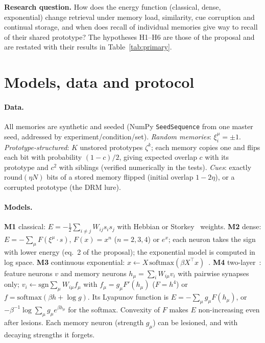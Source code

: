 \documentclass[10pt,a4paper]{article}
\begin{document}
\textbf{Research question.} How does the energy function (classical, dense, exponential) change retrieval under
memory load, similarity, cue corruption and continual storage, and when does recall of individual memories give way to
recall of their shared prototype? The hypotheses H1--H6 are those of the proposal and are restated with
their results in Table~\ref{tab:primary}.

\section{Models, data and protocol}
\paragraph{Data.} All memories are synthetic and seeded (NumPy \texttt{SeedSequence} from one master seed,
addressed by experiment/condition/set). \emph{Random memories}: $\xi_i^\mu=\pm1$. \emph{Prototype-structured}:
$K$ unstored prototypes $\zeta^k$; each memory copies one and flips each bit with probability $(1-c)/2$,
giving expected overlap $c$ with its prototype and $c^2$ with siblings (verified numerically in the tests).
\emph{Cues}: exactly $\mathrm{round}(\eta N)$ bits of a stored memory flipped (initial overlap $1-2\eta$), or a
corrupted prototype (the DRM lure).

\paragraph{Models.}
\textbf{M1} classical: $E=-\tfrac12\sum_{i\ne j}W_{ij}s_is_j$ with Hebbian or Storkey~\cite{storkey97} weights.
\textbf{M2} dense: $E=-\sum_\mu F(\xi^\mu\!\cdot s)$, $F(x)=x^n$ ($n=2,3,4$) or $e^x$; each neuron takes the sign
with lower energy (eq.~2 of the proposal); the exponential model is computed in log space.
\textbf{M3} continuous exponential: $x\leftarrow X\,\mathrm{softmax}(\beta X^\top x)$~\cite{ramsauer21}.
\textbf{M4} two-layer~\cite{krotov21}: feature neurons $v$ and memory neurons $h_\mu=\sum_iW_{i\mu}v_i$ with
pairwise synapses only; $v_i\leftarrow\mathrm{sgn}\sum_\mu W_{i\mu}f_\mu$ with $f_\mu=g_\mu F'(h_\mu)$ ($F=h^4$)
or $f=\mathrm{softmax}(\beta h+\log g)$. Its Lyapunov function is $E=-\sum_\mu g_\mu F(h_\mu)$, or $-\beta^{-1}\log\sum_\mu g_\mu e^{\beta h_\mu}$
for the softmax. Convexity of $F$ makes $E$ non-increasing even after lesions. Each memory neuron
(strength $g_\mu$) can be lesioned, and with decaying strengths it forgets.
\end{document}
